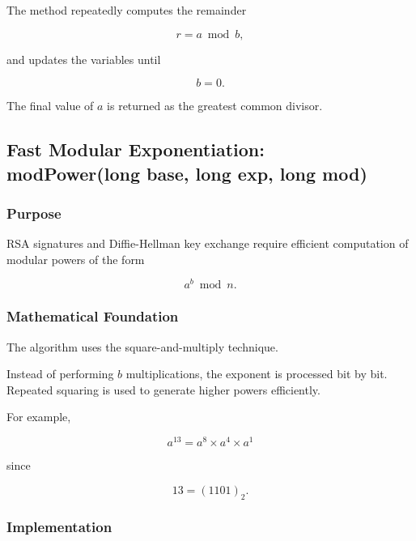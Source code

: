 \documentclass[12pt]{article}
\begin{document}
The method repeatedly computes the remainder

\begin{equation}
r = a \bmod b,
\end{equation}

and updates the variables until

\begin{equation}
b = 0.
\end{equation}

The final value of $a$ is returned as the greatest common divisor.


\subsection{Fast Modular Exponentiation: \\
modPower(long base, long exp, long mod)}

\subsubsection{Purpose}

RSA signatures and Diffie-Hellman key exchange require efficient computation
of modular powers of the form

\begin{equation}
a^b \bmod n.
\end{equation}

\subsubsection{Mathematical Foundation}

The algorithm uses the square-and-multiply technique.

Instead of performing $b$ multiplications, the exponent is processed bit by
bit. Repeated squaring is used to generate higher powers efficiently.

For example,

\begin{equation}
a^{13}=a^{8}\times a^{4}\times a^{1}
\end{equation}

since

\begin{equation}
13=(1101)_2.
\end{equation}

\subsubsection{Implementation}
\end{document}
